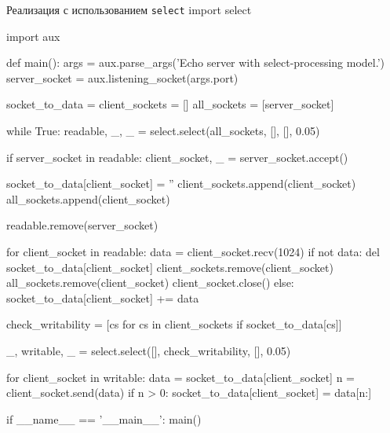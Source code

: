 \begin{pylst}{Реализация с использованием \lstinline{select}}{}
import select

import aux

def main():
    args = aux.parse_args('Echo server with select-processing model.')
    server_socket = aux.listening_socket(args.port)

    socket_to_data = {}
    client_sockets = []
    all_sockets = [server_socket]

    while True:
        readable, _, _ = select.select(all_sockets, [], [], 0.05)

        if server_socket in readable:
            client_socket, _ = server_socket.accept()

            socket_to_data[client_socket] = ''
            client_sockets.append(client_socket)
            all_sockets.append(client_socket)

            readable.remove(server_socket)

        for client_socket in readable:
            data = client_socket.recv(1024)
            if not data:
                del socket_to_data[client_socket]
                client_sockets.remove(client_socket)
                all_sockets.remove(client_socket)
                client_socket.close()
            else:
                socket_to_data[client_socket] += data

        check_writability = [cs for cs in client_sockets
                             if socket_to_data[cs]]

        _, writable, _ = select.select([], check_writability, [], 0.05)

        for client_socket in writable:
            data = socket_to_data[client_socket]
            n = client_socket.send(data)
            if n > 0:
                socket_to_data[client_socket] = data[n:]

if __name__ == '__main__':
    main()
\end{pylst}

